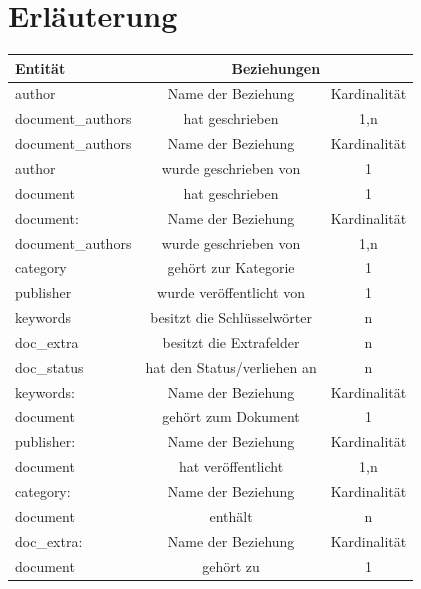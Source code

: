 \section{Erl\"auterung}

\begin{tabular}[ht]{|l||c|c|}
  \hline
  Entit\"at & \multicolumn{2}{c|}{Beziehungen} \\
  \hline\hline\hline
  
  author  & Name der Beziehung &  Kardinalit\"at\\
  \hline\hline
  document\_authors & hat geschrieben & 1,n \\
  \hline\hline\hline
  
  document\_authors & Name der Beziehung & Kardinalität\\
  \hline\hline
  author & wurde geschrieben von & 1\\
  \hline
  document & hat geschrieben & 1\\
  \hline\hline\hline
  
  document: & Name der Beziehung & Kardinalität\\
  \hline\hline
  document\_authors & wurde geschrieben von & 1,n\\
  \hline
  category & gehört zur Kategorie & 1\\
  \hline
  publisher & wurde veröffentlicht von & 1\\
  \hline
  keywords & besitzt die Schlüsselwörter & n\\  
  \hline
  doc\_extra & besitzt die Extrafelder & n\\
  \hline
  doc\_status & hat den Status/verliehen an & n\\
  \hline\hline\hline
  
  keywords:  & Name der Beziehung &  Kardinalit\"at\\
  \hline\hline
  document & gehört zum Dokument & 1 \\
  \hline\hline\hline
  
  publisher:  & Name der Beziehung &  Kardinalit\"at\\
  \hline\hline
  document & hat veröffentlicht & 1,n \\
  \hline\hline\hline
  
  category:  & Name der Beziehung &  Kardinalit\"at\\
  \hline\hline
  document & enthält & n \\
  \hline\hline\hline
  
  doc\_extra:  & Name der Beziehung &  Kardinalit\"at\\
  \hline\hline
  document & gehört zu & 1 \\
  \hline\hline\hline
  

\end{tabular}
